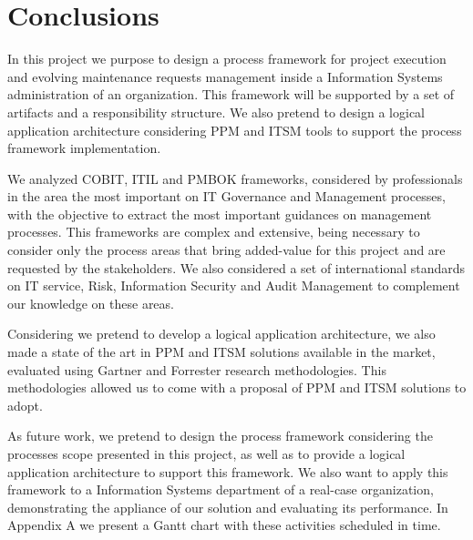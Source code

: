 
% 
% 

\section{Conclusions}

In this project we purpose to design a process framework for project execution and evolving maintenance requests management inside a Information Systems administration of an organization. This framework will be supported by a set of artifacts and a responsibility structure. We also pretend to design a logical application architecture considering PPM and ITSM tools to support the process framework implementation.\par
We analyzed COBIT, ITIL and PMBOK frameworks, considered by professionals in the area the most important on IT Governance and Management processes, with the objective to extract the most important guidances on management processes. This frameworks are complex and extensive, being necessary to consider only the process areas that bring added-value for this project and are requested by the stakeholders. We also considered a set of international standards on IT service, Risk, Information Security and Audit Management to complement our knowledge on these areas.\par
Considering we pretend to develop a logical application architecture, we also made a state of the art in PPM and ITSM solutions available in the market, evaluated using Gartner and Forrester research methodologies. This methodologies allowed us to come with a proposal of PPM and ITSM solutions to adopt.\par
As future work, we pretend to design the process framework considering the processes scope presented in this project, as well as to provide a logical application architecture to support this framework. We also want to apply this framework to a Information Systems department of a real-case organization, demonstrating the appliance of our solution and evaluating its performance. In Appendix A we present a Gantt chart with these activities scheduled in time.\par 

